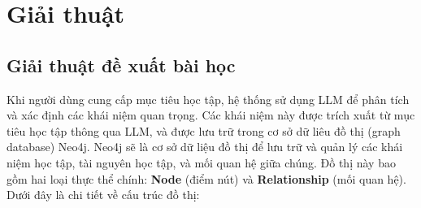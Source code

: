 \section{Giải thuật}
\subsection{Giải thuật đề xuất bài học}
Khi người dùng cung cấp mục tiêu học tập, hệ thống sử dụng LLM để phân tích và xác định các khái niệm quan trọng. Các khái niệm này được trích xuất từ mục tiêu học tập thông qua LLM, và được lưu trữ trong cơ sở dữ liêu đồ thị (graph database) Neo4j. Neo4j sẽ là cơ sở dữ liệu đồ thị để lưu trữ và quản lý các khái niệm học tập, tài nguyên học tập, và mối quan hệ giữa chúng. Đồ thị này bao gồm hai loại thực thể chính: \textbf{Node} (điểm nút) và \textbf{Relationship} (mối quan hệ). Dưới đây là chi tiết về cấu trúc đồ thị:

